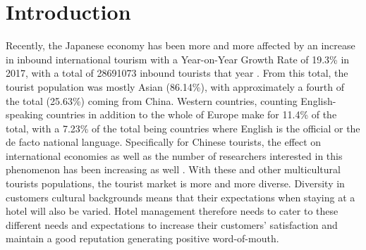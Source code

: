 \begin{abstract}


\end{abstract}

\linenumbers

\section{Introduction}\label{intro}

Recently, the Japanese economy has been more and more affected by an increase in inbound international tourism \cite[][]{jones2009} with a Year-on-Year Growth Rate of 19.3\% in 2017, with a total of \num[group-separator={,}]{28691073} inbound tourists that year \cite[][]{jnto2003-2019}. From this total, the tourist population was mostly Asian (86.14\%), with approximately a fourth of the total (25.63\%) coming from China. Western countries, counting English-speaking countries in addition to the whole of Europe make for 11.4\% of the total, with a 7.23\% of the total being countries where English is the official or the de facto national language. Specifically for Chinese tourists, the effect on international economies as well as the number of researchers interested in this phenomenon has been increasing as well \cite[][]{sun2017}. With these and other multicultural tourists populations, the tourist market is more and more diverse. Diversity in customers cultural backgrounds means that their expectations when staying at a hotel will also be varied. Hotel management therefore needs to cater to these different needs and expectations to increase their customers' satisfaction and maintain a good reputation generating positive word-of-mouth.

